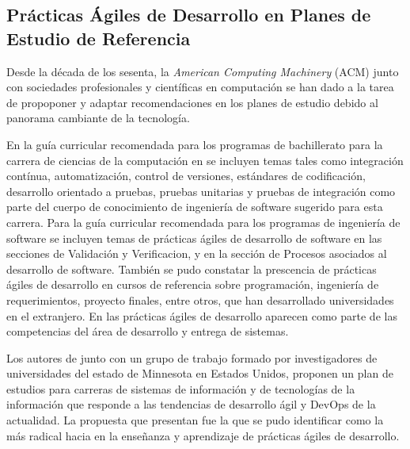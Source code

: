 \subsection{Prácticas Ágiles de Desarrollo en Planes de Estudio de Referencia}
Desde la década de los sesenta, la \emph{American Computing Machinery} (ACM) junto con sociedades profesionales y científicas en computación se han dado a la tarea de propoponer y adaptar  recomendaciones en los planes de estudio debido al panorama cambiante de la tecnología\cite{acm-curriculum}.

En la guía curricular recomendada para los programas de bachillerato para la carrera de ciencias de la computación en \cite{acm-cs-curriculum} se incluyen temas tales como integración contínua, automatización, control de versiones, estándares de codificación, desarrollo orientado a pruebas, pruebas unitarias y pruebas de integración como parte del cuerpo de conocimiento de ingeniería de software sugerido para esta carrera. Para la guía curricular recomendada para los programas de ingeniería de software \cite{acm-se-curriculum} se incluyen temas de prácticas ágiles de desarrollo de software en las secciones de Validación y Verificacion, y en la sección de Procesos asociados al desarrollo de software. También se pudo constatar la prescencia de prácticas ágiles de desarrollo en cursos de referencia sobre  programación, ingeniería de requerimientos, proyecto finales, entre otros, que han desarrollado universidades en el extranjero. En \cite{acm-msis-curriculum} las prácticas ágiles de desarrollo aparecen como parte de las competencias del área de desarrollo y entrega de sistemas. 

Los autores de \cite{betz-et-al} junto con un grupo de trabajo formado por investigadores de universidades del estado de Minnesota en Estados Unidos, proponen un plan de estudios para carreras de sistemas de información y de tecnologías de la información que responde a las tendencias de desarrollo ágil y DevOps \cite{advance-it} de la actualidad. La propuesta que presentan fue la que se pudo identificar como la más radical hacia en la enseñanza y aprendizaje de prácticas ágiles de desarrollo.

